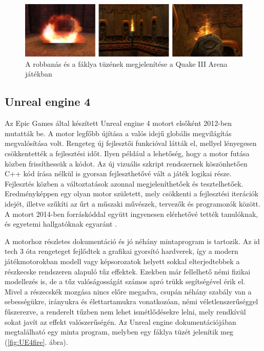 
\begin{figure}[h]
\centering
\includegraphics[width=\textwidth]{kepek/quake3fire.png}
\caption{A robbanás és a fáklya tüzének megjelenítése a Quake III Arena játékban}
\label{fig:quake3fire}
\end{figure}



\subsection{Unreal engine 4}

Az Epic Games által készített Unreal engine 4 motort elsőként 2012-ben mutatták be. A motor legfőbb újítása a valós idejű globális megvilágítás megvalósítása volt. Rengeteg új fejlesztői funkcióval látták el, mellyel lényegesen csökkentették a fejlesztési időt. Ilyen például a lehetőség, hogy a motor futása közben frissíthessük a kódot. Az új vizuális szkript rendszernek köszönhetően C++ kód írása nélkül is gyorsan fejleszthetővé vált a játék logikai része. Fejlesztés közben a változtatások azonnal megjeleníthetőek és tesztelhetőek. Eredményképpen egy olyan motor született, mely csökkenti a fejlesztési iterációk idejét, illetve szűkíti az űrt a műszaki művészek, tervezők és programozók között. A motort 2014-ben forráskóddal együtt ingyenesen elérhetővé tették tanulóknak, és egyetemi hallgatóknak egyaránt \cite{wikUE4}.

A motorhoz részletes dokumentáció és jó néhány mintaprogram is tartozik. Az id tech 3 óta rengeteget fejlődtek a grafikai gyorsító hardverek, így a modern játékmotorokban modell vagy képsorozatok helyett sokkal elterjedtebbek a részkecske rendszeren alapuló tűz effektek. Ezekben már fellelhető némi fizikai modellezés is, de a tűz valóságosságát számos apró trükk segítségével érik el. Mivel a részecskék mozgása nincs előre megadva, csupán néhány szabály van a sebességükre, irányukra és élettartamukra vonatkozóan, némi véletlenszerűséggel fűszerezve, a renderelt tűzben nem lehet ismétlődésekre lelni, mely rendkívül sokat javít az effekt valószerűségén. Az Unreal engine dokumentációjában megtalálható egy minta program, melyben egy fáklya tüzét jelenítik meg (\ref{fig:UE4fire}. ábra).

